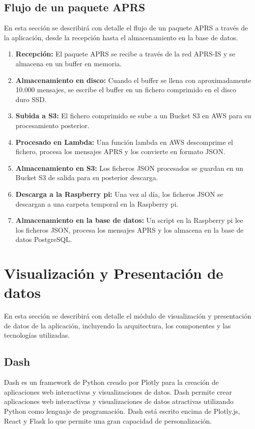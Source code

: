 \subsection{Flujo de un paquete APRS}
En esta sección se describirá con detalle el flujo de un paquete APRS a través de la aplicación, desde la recepción hasta el almacenamiento en la base de datos.
\begin{enumerate}
	\item \textbf{Recepción:} El paquete APRS se recibe a través de la red APRS-IS y se almacena en un buffer en memoria.
	\item \textbf{Almacenamiento en disco:} Cuando el buffer se llena con aproximadamente 10.000 mensajes, se escribe el buffer en un fichero comprimido en el disco duro SSD.
	\item \textbf{Subida a S3:} El fichero comprimido se sube a un Bucket S3 en AWS para su procesamiento posterior.
	\item \textbf{Procesado en Lambda:} Una función lambda en AWS descomprime el fichero, procesa los mensajes APRS y los convierte en formato JSON.
	\item \textbf{Almacenamiento en S3:} Los ficheros JSON procesados se guardan en un Bucket S3 de salida para su posterior descarga.
	\item \textbf{Descarga a la Raspberry pi:} Una vez al día, los ficheros JSON se descargan a una carpeta temporal en la Raspberry pi.
	\item \textbf{Almacenamiento en la base de datos:} Un script en la Raspberry pi lee los ficheros JSON, procesa los mensajes APRS y los almacena en la base de datos PostgreSQL.
\end{enumerate}


\section{Visualización y Presentación de datos}

En esta sección se describirá con detalle el módulo de visualización y presentación de datos de la aplicación, incluyendo la arquitectura, los componentes y las tecnologías utilizadas.

\subsection*{Dash}
Dash es un framework de Python creado por Plotly para la creación de aplicaciones web interactivas y visualizaciones de datos. Dash permite crear aplicaciones web interactivas y visualizaciones de datos atractivas utilizando Python como lenguaje de programación. Dash está escrito encima de Plotly.js, React y Flask lo que permite una gran capacidad de personalización.

